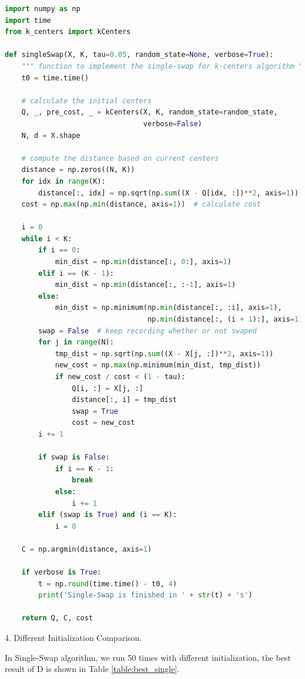 \begin{description}
\begin{description}
\begin{lstlisting}[language=Python, caption=Single-Swap Algorithm Python Code]
import numpy as np
import time
from k_centers import kCenters

def singleSwap(X, K, tau=0.05, random_state=None, verbose=True):
    """ function to implement the single-swap for k-centers algorithm """
    t0 = time.time()

    # calculate the initial centers
    Q, _, pre_cost, _ = kCenters(X, K, random_state=random_state,
                                 verbose=False)
    N, d = X.shape

    # compute the distance based on current centers
    distance = np.zeros((N, K))
    for idx in range(K):
        distance[:, idx] = np.sqrt(np.sum((X - Q[idx, :])**2, axis=1))
    cost = np.max(np.min(distance, axis=1))  # calculate cost

    i = 0
    while i < K:
        if i == 0:
            min_dist = np.min(distance[:, 0:], axis=1)
        elif i == (K - 1):
            min_dist = np.min(distance[:, :-1], axis=1)
        else:
            min_dist = np.minimum(np.min(distance[:, :i], axis=1),
                                  np.min(distance[:, (i + 1):], axis=1))
        swap = False  # keep recording whether or not swaped
        for j in range(N):
            tmp_dist = np.sqrt(np.sum((X - X[j, :])**2, axis=1))
            new_cost = np.max(np.minimum(min_dist, tmp_dist))
            if new_cost / cost < (1 - tau):
                Q[i, :] = X[j, :]
                distance[:, i] = tmp_dist
                swap = True
                cost = new_cost
        i += 1

        if swap is False:
            if i == K - 1:
                break
            else:
                i += 1
        elif (swap is True) and (i == K):
            i = 0

    C = np.argmin(distance, axis=1)

    if verbose is True:
        t = np.round(time.time() - t0, 4)
        print('Single-Swap is finished in ' + str(t) + 's')

    return Q, C, cost
\end{lstlisting}

\item{4.} Different Initialization Comparison.

In Single-Swap algorithm, we run 50 times with different initialization, the best result of D is shown in Table \ref{table:best_single}.


\end{description}
\end{description}
